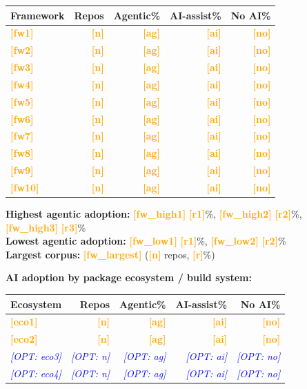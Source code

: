 \documentclass[10pt,a4paper]{article}
\newcommand{\FILLIN}[1]{\textcolor{orange}{\textbf{[#1]}}}
\newcommand{\OPT}[1]{\textcolor{blue}{\textit{[OPT: #1]}}}
\begin{document}
\vspace{3pt}
\begin{tabular}{@{}lrrrr@{}}
\toprule
Framework & Repos & Agentic\% & AI-assist\% & No AI\% \\
\midrule
\FILLIN{fw1}  & \FILLIN{n}  & \FILLIN{ag} & \FILLIN{ai} & \FILLIN{no} \\
\FILLIN{fw2}  & \FILLIN{n}  & \FILLIN{ag} & \FILLIN{ai} & \FILLIN{no} \\
\FILLIN{fw3}  & \FILLIN{n}  & \FILLIN{ag} & \FILLIN{ai} & \FILLIN{no} \\
\FILLIN{fw4}  & \FILLIN{n}  & \FILLIN{ag} & \FILLIN{ai} & \FILLIN{no} \\
\FILLIN{fw5}  & \FILLIN{n}  & \FILLIN{ag} & \FILLIN{ai} & \FILLIN{no} \\
\FILLIN{fw6}  & \FILLIN{n}  & \FILLIN{ag} & \FILLIN{ai} & \FILLIN{no} \\
\FILLIN{fw7}  & \FILLIN{n}  & \FILLIN{ag} & \FILLIN{ai} & \FILLIN{no} \\
\FILLIN{fw8}  & \FILLIN{n}  & \FILLIN{ag} & \FILLIN{ai} & \FILLIN{no} \\
\FILLIN{fw9}  & \FILLIN{n}  & \FILLIN{ag} & \FILLIN{ai} & \FILLIN{no} \\
\FILLIN{fw10} & \FILLIN{n}  & \FILLIN{ag} & \FILLIN{ai} & \FILLIN{no} \\
\bottomrule
\end{tabular}

\vspace{4pt}
\textbf{Highest agentic adoption:} \FILLIN{fw\_high1} \FILLIN{r1}\%, \FILLIN{fw\_high2} \FILLIN{r2}\%, \FILLIN{fw\_high3} \FILLIN{r3}\%\\
\textbf{Lowest agentic adoption:} \FILLIN{fw\_low1} \FILLIN{r1}\%, \FILLIN{fw\_low2} \FILLIN{r2}\%\\
\textbf{Largest corpus:} \FILLIN{fw\_largest} (\FILLIN{n} repos, \FILLIN{r}\%)

\vspace{6pt}
\textbf{AI adoption by package ecosystem / build system:}

\vspace{3pt}
\begin{tabular}{@{}lrrrr@{}}
\toprule
Ecosystem & Repos & Agentic\% & AI-assist\% & No AI\% \\
\midrule
\FILLIN{eco1} & \FILLIN{n} & \FILLIN{ag} & \FILLIN{ai} & \FILLIN{no} \\
\FILLIN{eco2} & \FILLIN{n} & \FILLIN{ag} & \FILLIN{ai} & \FILLIN{no} \\
\OPT{eco3}    & \OPT{n}    & \OPT{ag}    & \OPT{ai}    & \OPT{no}    \\
\OPT{eco4}    & \OPT{n}    & \OPT{ag}    & \OPT{ai}    & \OPT{no}    \\
\bottomrule
\end{tabular}
\end{document}
